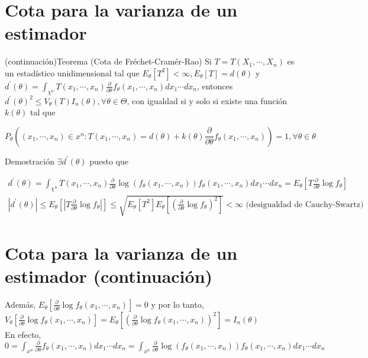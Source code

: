 \section*{Cota para la varianza de un estimador}
 (continuación)Teorema (Cota de Fréchet-Cramér-Rao) Si $T=T\left(X_{1}, \cdots, X_{n}\right)$ es un estadístico unidimensional tal que $E_{\theta}\left[T^{2}\right]<\infty, E_{\theta}[T]=d(\theta)$ y $d^{\prime}(\theta)=\int_{\chi^{n}} T\left(x_{1}, \cdots, x_{n}\right) \frac{\partial}{\partial \theta} f_{\theta}\left(x_{1}, \cdots, x_{n}\right) d x_{1} \cdots d x_{n}$, entonces $d^{\prime}(\theta)^{2} \leq V_{\theta}(T) I_{n}(\theta), \forall \theta \in \Theta$, con igualdad si y solo si existe una función $k(\theta)$ tal que

$$
  P_{\theta}\left(\left(x_{1}, \cdots, x_{n}\right) \in x^{n}: T\left(x_{1}, \cdots, x_{n}\right)=d(\theta)+k(\theta) \frac{\partial}{\partial \theta} f_{\theta}\left(x_{1}, \cdots, x_{n}\right)\right)=1, \forall \theta \in \theta
$$

Demostración $\exists d^{\prime}(\theta)$ puesto que

$$
  \begin{gathered}
    d^{\prime}(\theta)=\int_{\chi^{n}} T\left(x_{1}, \cdots, x_{n}\right) \frac{\partial}{\partial \theta} \log \left(f_{\theta}\left(x_{1}, \cdots, x_{n}\right)\right) f_{\theta}\left(x_{1}, \cdots, x_{n}\right) d x_{1} \cdots d x_{n}=E_{\theta}\left[T \frac{\partial}{\partial \theta} \log f_{\theta}\right] \\
    \left|d^{\prime}(\theta)\right| \leq E_{\theta}\left[\left|T \frac{\partial}{\partial \theta} \log f_{\theta}\right|\right] \leq \sqrt{E_{\theta}\left[T^{2}\right] E_{\theta}\left[\left(\frac{\partial}{\partial \theta} \log f_{\theta}\right)^{2}\right]}<\infty \text { (desigualdad de Cauchy-Swartz) }
  \end{gathered}
$$

\section*{Cota para la varianza de un estimador (continuación)}
Además, $E_{\theta}\left[\frac{\partial}{\partial \theta} \log f_{\theta}\left(x_{1}, \cdots, x_{n}\right)\right]=0$ y por lo tanto,\\
$V_{\theta}\left[\frac{\partial}{\partial \theta} \log f_{\theta}\left(x_{1}, \cdots, x_{n}\right)\right]=E_{\theta}\left[\left(\frac{\partial}{\partial \theta} \log f_{\theta}\left(x_{1}, \cdots, x_{n}\right)\right)^{2}\right]=I_{n}(\theta)$\\
En efecto, $0=\int_{x^{n}} \frac{\partial}{\partial \theta} f_{\theta}\left(x_{1}, \cdots, x_{n}\right) d x_{1} \cdots d x_{n}=\int_{x^{n}} \frac{\partial}{\partial \theta} \log \left(f_{\theta}\left(x_{1}, \cdots, x_{n}\right)\right) f_{\theta}\left(x_{1}, \cdots, x_{n}\right) d x_{1} \cdots d x_{n}$

